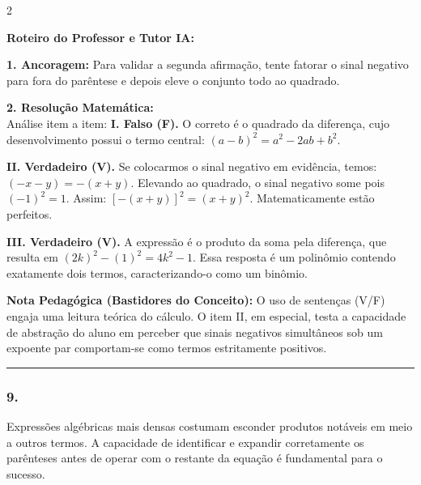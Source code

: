 \begin{multicols*}{2}
\ifgabarito
    \begin{tcolorbox}[colback=CorTitUm!5, colframe=CorTitUm, boxrule=1pt, arc=4pt, left=6pt, right=6pt, top=6pt, bottom=6pt]
    \small\textbf{\textcolor{CorTitUm}{Roteiro do Professor e Tutor IA:}}\par\vspace{0.1cm}
    \color{CinzaEscuro}
    \textbf{1. Ancoragem:} Para validar a segunda afirmação, tente fatorar o sinal negativo para fora do parêntese e depois eleve o conjunto todo ao quadrado.\par\vspace{0.1cm}
    \textbf{2. Resolução Matemática:}\\
    Análise item a item:
    \textbf{I. Falso (F).} O correto é o quadrado da diferença, cujo desenvolvimento possui o termo central: $ (a - b)^2 = a^2 - 2ab + b^2 $.
    
    \textbf{II. Verdadeiro (V).} Se colocarmos o sinal negativo em evidência, temos: $ (-x - y) = -(x + y) $. Elevando ao quadrado, o sinal negativo some pois $(-1)^2 = 1$. Assim: $ [-(x + y)]^2 = (x + y)^2 $. Matematicamente estão perfeitos.
    
    \textbf{III. Verdadeiro (V).} A expressão é o produto da soma pela diferença, que resulta em $ (2k)^2 - (1)^2 = 4k^2 - 1 $. Essa resposta é um polinômio contendo exatamente dois termos, caracterizando-o como um binômio.
    \end{tcolorbox}
    \vspace{0.15cm}
    
    \begin{boxexplicacao}
    \textbf{Nota Pedagógica (Bastidores do Conceito):} O uso de sentenças (V/F) engaja uma leitura teórica do cálculo. O item II, em especial, testa a capacidade de abstração do aluno em perceber que sinais negativos simultâneos sob um expoente par comportam-se como termos estritamente positivos.
    \end{boxexplicacao}
\fi

\par\vspace{\espacoQuestao}

\noindent\textcolor{CorLinha}{\rule{\linewidth}{0.5pt}} 
\par\vspace{\espacoPreQuestao}
\subsubsection*{9.} 
\begin{enunciadoLiteral}
Expressões algébricas mais densas costumam esconder produtos notáveis em meio a outros termos. A capacidade de identificar e expandir corretamente os parênteses antes de operar com o restante da equação é fundamental para o sucesso.


\end{enunciadoLiteral}
\end{multicols*}
